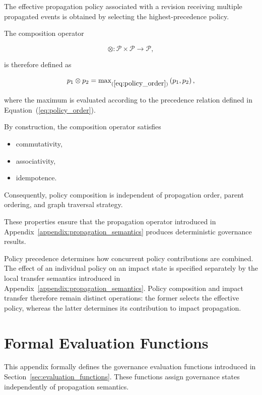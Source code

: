 \documentclass[10pt]{article}
\begin{document}
The effective propagation policy associated with a revision receiving multiple propagated events is obtained by selecting the highest-precedence policy.

The composition operator

\begin{equation}
	\otimes :
	\mathcal{P}\times\mathcal{P}
	\rightarrow
	\mathcal{P},
	\label{eq:policy_composition}
\end{equation}

is therefore defined as

\begin{equation}
	p_1\otimes p_2
	=
	\max\nolimits_{(\ref{eq:policy_order})}
	\left(p_1,p_2\right),
	\label{eq:policy_max}
\end{equation}

where the maximum is evaluated according to the precedence relation defined in Equation~(\ref{eq:policy_order}).

By construction, the composition operator satisfies

\begin{itemize}
	\item commutativity,
	\item associativity,
	\item idempotence.
\end{itemize}

Consequently, policy composition is independent of propagation order, parent ordering, and graph traversal strategy.

These properties ensure that the propagation operator introduced in Appendix~\ref{appendix:propagation_semantics} produces deterministic governance results.

Policy precedence determines how concurrent policy contributions are combined.
The effect of an individual policy on an impact state is specified separately
by the local transfer semantics introduced in
Appendix~\ref{appendix:propagation_semantics}. Policy composition and impact
transfer therefore remain distinct operations: the former selects the effective
policy, whereas the latter determines its contribution to impact propagation.

\section{Formal Evaluation Functions}
\label{appendix:evaluation_functions}

This appendix formally defines the governance evaluation functions introduced in Section~\ref{sec:evaluation_functions}. These functions assign governance states independently of propagation semantics.
\end{document}
